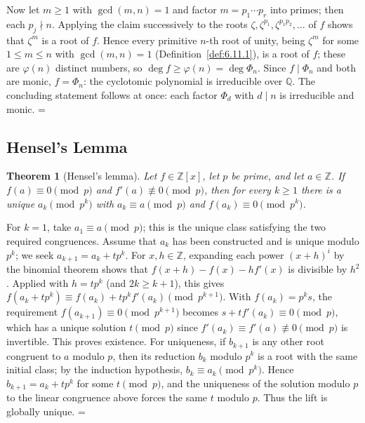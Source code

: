 \documentclass[11pt]{article}
\makeatletter
\theoremstyle{ntstyle}
\newtheorem{theorem}{Theorem}[subsection]
\let\nt@closedisplay\]
\def\nt@guardedclose{\@ifnextchar\par{\nt@closeafterpar}{\@ifnextchar\end{\postdisplaypenalty\@M\nt@closedisplay}{\nt@closedisplay}}}
\def\nt@closeafterpar\par{\@ifnextchar\par{\nt@closeafterpar}{\@ifnextchar\end{\postdisplaypenalty\@M\nt@closedisplay\par}{\nt@closedisplay\par}}}
\renewenvironment{proof}[1][\proofname]{\par
  \pushQED{\qed}\normalfont\topsep\medskipamount\edef\nt@afterproof{\@endparpenalty=\the\@endparpenalty\relax}\@beginparpenalty\@M\@endparpenalty\@M\let\]\nt@guardedclose\trivlist\item[]\textit{#1\@addpunct{.}} \ignorespaces}{\ifvmode\addpenalty\@M\fi\popQED\nt@afterproof\endtrivlist\@endpefalse}
\makeatother
\begin{document}
\begin{proof}
	Now let $m\ge1$ with $\gcd(m, n) = 1$ and factor $m = p_1\cdots p_r$
	into primes; then each $p_j\nmid n$. Applying the claim successively to
	the roots $\zeta, \zeta^{p_1}, \zeta^{p_1p_2}, \ldots$ of $f$ shows
	that $\zeta^{m}$ is a root of $f$. Hence every primitive $n$-th root
	of unity, being $\zeta^{m}$ for some $1\le m\le n$ with $\gcd(m,n)=1$
	(Definition~\ref{def:6.11.1}), is a root of $f$; these are $\varphi(n)$ distinct numbers, so $\deg
	f\ge\varphi(n) = \deg\Phi_n$.
	Since $f\mid\Phi_n$ and both are monic, $f = \Phi_n$: the cyclotomic
	polynomial is irreducible over $\mathbb{Q}$. The concluding
	statement follows at once: each factor $\Phi_d$ with $d\mid n$ is
	irreducible and monic.
\end{proof}
\subsection{Hensel's Lemma}

\begin{theorem}[Hensel's lemma]\label{thm:11.4.1} Let
	$f\in\mathbb{Z}[x]$, let $p$ be prime, and let $a\in\mathbb{Z}$. If
	$f(a)\equiv0\pmod{p}$ and
	$f'(a)\not\equiv0\pmod{p}$, then for every $k\ge1$ there is a unique
	$a_k\pmod{p^k}$ with $a_k\equiv a\pmod{p}$ and $f(a_k)\equiv0\pmod{p^k}$.
\end{theorem}

\begin{proof} For $k=1$, take $a_1\equiv a\pmod{p}$; this is the unique
	class satisfying the two required congruences. Assume that $a_k$ has
	been constructed and is unique modulo $p^k$; we seek $a_{k+1}=a_k+tp^k$.
	For $x,h\in\mathbb{Z}$, expanding each power $(x+h)^i$ by the
	binomial theorem shows that
	$f(x+h)-f(x)-hf'(x)$ is divisible by $h^2$. Applied with
	$h=tp^k$ (and $2k\ge k+1$), this gives
	$f(a_k + tp^k)\equiv f(a_k) +
		t p^k f'(a_k)\pmod{p^{k+1}}$. With $f(a_k) = p^k s$, the
	requirement $f(a_{k+1})\equiv0\pmod{p^{k+1}}$ becomes $s + t
		f'(a_k)\equiv0\pmod{p}$, which has a unique solution $t\pmod{p}$ since
	$f'(a_k)\equiv f'(a)\not\equiv0\pmod{p}$ is invertible. This proves existence. For uniqueness, if
	$b_{k+1}$ is any other root congruent to $a$ modulo $p$, then its reduction $b_k$ modulo $p^k$ is
	a root with the same initial class; by the induction hypothesis, $b_k\equiv a_k\pmod{p^k}$. Hence
	$b_{k+1}=a_k+tp^k$ for some $t\pmod{p}$, and the uniqueness of the solution modulo $p$ to the
	linear congruence above forces the same $t$ modulo $p$. Thus the lift is globally unique.
\end{proof}
\end{document}
